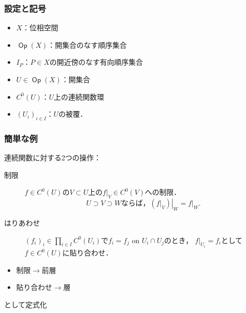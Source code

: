 \documentclass[dvipdfmx,12pt,aspectratio=169,leqno]{beamer}%
\numberwithin{equation}{subsection}
\newcommand{\Op}{\mathop{\textsf{Op}}\nolimits}
\theoremstyle{mystyle}
\begin{document}
\begin{frame}
    \frametitle{設定と記号}
    \begin{itemize}
        \item \(X\)：位相空間
        \item \(\Op(X)\)：開集合のなす順序集合
        \item \(I_P\)：\(P\in X\)の開近傍のなす有向順序集合
        \item \(U\in \Op(X)\)：開集合
        \item \(C^0(U)\)：\(U\)上の連続関数環
        \item \((U_i)_{i\in I}\)：\(U\)の被覆．
    \end{itemize}
\end{frame}

\begin{frame}
    \frametitle{簡単な例}

    連続関数に対する2つの操作：
    \begin{description}
        \item[制限]\(f\in C^0(U)\)の\(V\subset U\)上の\(f\rvert_V\in C^0(V)\)への制限．
        \[
            \text{\(U\supset V\supset W\)ならば，}
            \left.({f\rvert_V})\right\rvert_W=f\rvert_W.
        \]
        \item[はりあわせ]
        \((f_i)_{i}\in\prod_{i\in I}^{}C^{0}(U_i)\)で\(f_i=f_j\) on \(U_i\cap U_j\)のとき，
        \(f\rvert_{U_i}=f_i\)として\(f\in C^{0}(U)\)に貼り合わせ．
    \end{description}

    \bigskip
    \begin{itemize}
        \item 制限\(\to\)前層
        \item 貼り合わせ\(\to\)層
    \end{itemize}
    として定式化
\end{frame}
\end{document}
